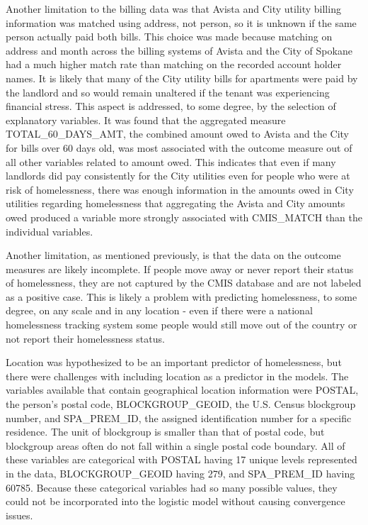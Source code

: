 \documentclass[utf8]{frontiersFPHY} %
\begin{document}
Another limitation to the billing data was that Avista and City utility billing information was matched using address, not person, so it is unknown if the same person actually paid both bills. This choice was made because matching on address and month across the billing systems of Avista and the City of Spokane had a much higher match rate than matching on the recorded account holder names. It is likely that many of the City utility bills for apartments were paid by the landlord and so would remain unaltered if the tenant was experiencing financial stress. This aspect is addressed, to some degree, by the selection of explanatory variables. It was found that the aggregated measure TOTAL\_60\_DAYS\_AMT, the combined amount owed to Avista and the City for bills over 60 days old, was most associated with the outcome measure out of all other variables related to amount owed. This indicates that even if many landlords did pay consistently for the City utilities even for people who were at risk of homelessness, there was enough information in the amounts owed in City utilities regarding homelessness that aggregating the Avista and City amounts owed produced a variable more strongly associated with CMIS\_MATCH than the individual variables.

Another limitation, as mentioned previously, is that the data on the outcome measures are likely incomplete. If people move away or never report their status of homelessness, they are not captured by the CMIS database and are not labeled as a positive case. This is likely a problem with predicting homelessness, to some degree, on any scale and in any location - even if there were a national homelessness tracking system some people would still move out of the country or not report their homelessness status.

Location was hypothesized to be an important predictor of homelessness, but there were challenges with including location as a predictor in the models. The variables available that contain geographical location information were POSTAL, the person's postal code, BLOCKGROUP\_GEOID, the U.S. Census blockgroup number, and SPA\_PREM\_ID, the assigned identification number for a specific residence. The unit of blockgroup is smaller than that of postal code, but blockgroup areas often do not fall within a single postal code boundary. All of these variables are categorical with POSTAL having 17 unique levels represented in the data, BLOCKGROUP\_GEOID having 279, and SPA\_PREM\_ID having 60785. Because these categorical variables had so many possible values, they could not be incorporated into the logistic model without causing convergence issues.
\end{document}
